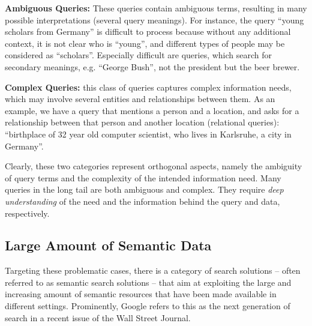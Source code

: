 	\textbf{Ambiguous Queries:} These queries contain ambiguous terms, resulting in many possible interpretations (several query meanings). For instance, the query ``young scholars from Germany'' is difficult to process because without any additional context, it is not clear who is ``young'', and different types of people may be considered as ``scholars''. Especially difficult are queries, which search for secondary meanings, e.g. ``George Bush'', not the president but the beer brewer.  
	 
	\textbf{Complex Queries:} this class of queries captures complex information needs, which may involve several entities and relationships between them. As an example, we have a query that mentions a person and a location, and asks for a relationship between that person and another location (relational queries):  ``birthplace of 32 year old computer scientist, who lives in Karlsruhe, a city in Germany''. 

Clearly, these two categories represent orthogonal aspects, namely the ambiguity of query terms and the complexity of the intended information need. Many queries in the long tail are both ambiguous and complex. They require \emph{deep understanding} of the need and the information behind the query and data, respectively. 	

\subsection{Large Amount of Semantic Data}
Targeting these problematic cases, there is a category of search solutions -- often referred to as semantic search solutions -- that aim at exploiting the large and increasing amount of semantic resources that have been made available in different settings. Prominently, Google refers to this as the next generation of search in a recent issue of the Wall Street Journal.

